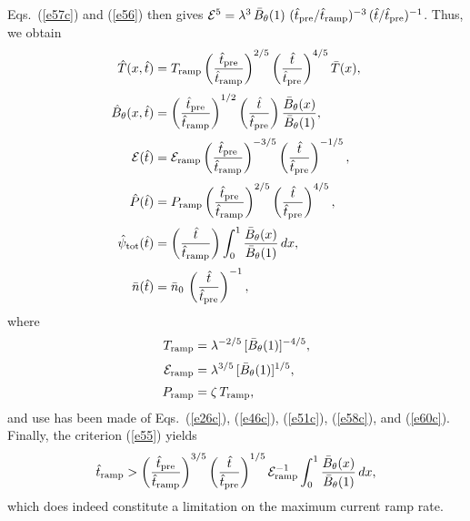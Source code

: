 \documentclass{iopjournal}
\begin{document}
Eqs.~(\ref{e57c}) and (\ref{e56}) then gives ${\cal E}^5 = \lambda^3\,\bar{B}_\theta(1)\,\,(\hat{t}_{\rm pre}/\hat{t}_{\rm ramp})^{-3}\,(\hat{t}/\hat{t}_{\rm pre})^{-1}$. 
Thus, we obtain
\begin{align}
\hat{T}(x,\hat{t}) &= T_{\rm ramp}\left(\frac{\hat{t}_{\rm pre}}{\hat{t}_{\rm ramp}}\right)^{2/5}\left(\frac{\hat{t}}{\hat{t}_{\rm pre}}\right)^{4/5}\bar{T}(x),\\[0.5ex]
\hat{B}_\theta(x,\hat{t})&= \left(\frac{\hat{t}_{\rm pre}}{\hat{t}_{\rm ramp}}\right)^{1/2}\left(\frac{\hat{t}}{\hat{t}_{\rm pre}}\right)\frac{\bar{B}_\theta(x)}{\bar{B}_\theta(1)},\\[0.5ex]
{\cal E}(\hat{t}) &= {\cal E}_{\rm ramp}\left(\frac{\hat{t}_{\rm pre}}{\hat{t}_{\rm ramp}}\right)^{-3/5}\left(\frac{\hat{t}}{\hat{t}_{\rm pre}}\right)^{-1/5},\\[0.5ex]
\hat{P}(\hat{t}) &= P_{\rm ramp}\left(\frac{\hat{t}_{\rm pre}}{\hat{t}_{\rm ramp}}\right)^{2/5}\left(\frac{\hat{t}}{\hat{t}_{\rm pre}}\right)^{4/5},\\[0.5ex]
\hat{\psi}_{\rm tot}(\hat{t})&= \left(\frac{\hat{t}}{\hat{t}_{\rm ramp}}\right)\int_0^1\frac{\bar{B}_{\theta}(x)}{\bar{B}_\theta(1)}\,dx,\\[0.5ex]
\bar{n}(\hat{t})&= \bar{n}_0\,\left(\frac{\hat{t}}{\hat{t}_{\rm pre}}\right)^{-1},
\end{align}
where
\begin{align}
T_{\rm ramp}&= \lambda^{-2/5}\,[\bar{B}_\theta(1)]^{-4/5},\\[0.5ex]
{\cal E}_{\rm ramp} &= \lambda^{3/5}\,[\bar{B}_\theta(1)]^{1/5},\\[0.5ex]
P_{\rm ramp} &= \zeta\,T_{\rm ramp},
\end{align}
and use has been made of Eqs.~(\ref{e26c}), (\ref{e46c}), (\ref{e51c}), (\ref{e58c}), and (\ref{e60c}). 
Finally, the criterion (\ref{e55}) yields
\begin{equation}\label{e55d}
\hat{t}_{\rm ramp} > \left(\frac{\hat{t}_{\rm pre}}{\hat{t}_{\rm ramp}}\right)^{3/5}\left(\frac{\hat{t}}{\hat{t}_{\rm pre}}\right)^{1/5}{\cal E}_{\rm ramp}^{-1}\int_0^1\frac{\bar{B}_{\theta}(x)}{\bar{B}_\theta(1)}\,dx,
\end{equation}
which does indeed constitute a limitation on the maximum current ramp rate.
\end{document}
